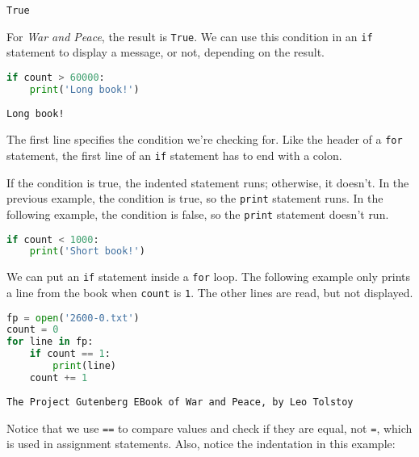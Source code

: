 \begin{lstlisting}[style=output]
True
\end{lstlisting}

For \emph{War and Peace}, the result is \passthrough{\lstinline!True!}.
We can use this condition in an \passthrough{\lstinline!if!} statement
to display a message, or not, depending on the result.

\begin{lstlisting}[language=Python,style=source]
if count > 60000:
    print('Long book!')
\end{lstlisting}

\begin{lstlisting}[style=output]
Long book!
\end{lstlisting}

The first line specifies the condition we're checking for. Like the
header of a \passthrough{\lstinline!for!} statement, the first line of
an \passthrough{\lstinline!if!} statement has to end with a colon.

If the condition is true, the indented statement runs; otherwise, it
doesn't. In the previous example, the condition is true, so the
\passthrough{\lstinline!print!} statement runs. In the following
example, the condition is false, so the \passthrough{\lstinline!print!}
statement doesn't run.

\begin{lstlisting}[language=Python,style=source]
if count < 1000:
    print('Short book!')
\end{lstlisting}

We can put an \passthrough{\lstinline!if!} statement inside a
\passthrough{\lstinline!for!} loop. The following example only prints a
line from the book when \passthrough{\lstinline!count!} is
\passthrough{\lstinline!1!}. The other lines are read, but not
displayed.

\begin{lstlisting}[language=Python,style=source]
fp = open('2600-0.txt')
count = 0
for line in fp:
    if count == 1:
        print(line)
    count += 1
\end{lstlisting}

\begin{lstlisting}[style=output]
The Project Gutenberg EBook of War and Peace, by Leo Tolstoy
\end{lstlisting}

Notice that we use \passthrough{\lstinline!==!} to compare values and
check if they are equal, not \passthrough{\lstinline!=!}, which is used
in assignment statements. Also, notice the indentation in this example:


